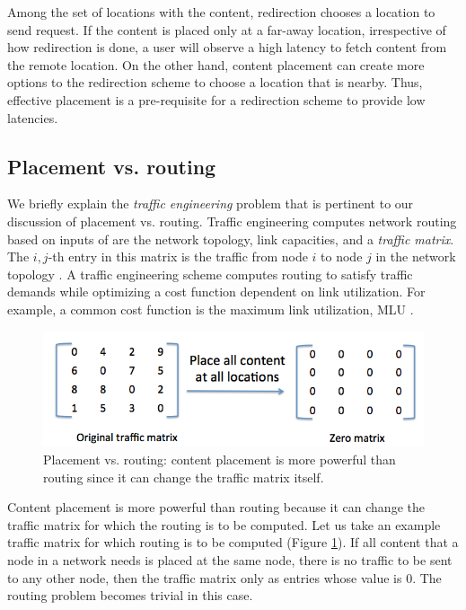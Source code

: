 Among the set of locations with the content, redirection chooses a location to send request. If the content is placed only at a far-away location, irrespective of how redirection is done, a user will observe a high latency to fetch content from the remote location. On the other hand, content placement can create more options to the redirection scheme to choose a location that is nearby. Thus, effective placement is a pre-requisite for a redirection scheme to provide low latencies.


\subsection{Placement vs. routing}

We briefly explain the \emph{traffic engineering} problem that is pertinent to our discussion of placement vs. routing. Traffic engineering computes network routing based on inputs of are the network topology, link capacities, and a \emph{traffic matrix}. The $i,j$-th entry in this matrix is the traffic from node $i$ to node $j$ in the network topology \cite{fortz2000internet}. A traffic engineering scheme computes routing to satisfy traffic demands while optimizing a cost function dependent on link utilization. For example, a common cost function is the maximum link utilization, MLU \cite{rexford}. 

\begin{figure}
	\centering
	\includegraphics[scale=0.4]{fig/placement-vs-routing.png}
	\caption{Placement vs. routing: content placement is more powerful than routing since it can change the  traffic matrix itself.}
	\label{fig:placement-routing}
\end{figure}

Content placement is more powerful than routing because it can change the traffic matrix for which the routing is to be computed. Let us take an example traffic matrix for which routing is to be computed (Figure \ref{fig:placement-routing}). If all content that a node in a network needs is placed at the same node, there is no traffic to be sent to any other node, then the traffic matrix only as entries whose value is 0. The routing problem becomes trivial in this case. 

